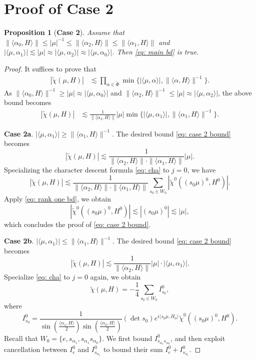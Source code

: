 \documentclass{amsart}
\numberwithin{equation}{section}
\newtheorem{prop}[thm]{Proposition}
\numberwithin{equation}{section}
\begin{document}
\section{Proof of \textbf{Case 2}}\label{sec: case 2}

\begin{prop}[\textbf{Case 2}]\label{prop: case 2}
    Assume that $\|\langle\alpha_0, H\rangle\|\leq|\mu|^{-1}\leq  \|\langle\alpha_2, H\rangle\|\leq \|\langle\alpha_1, H\rangle\|$ and $| \langle\mu,\alpha_1\rangle|\lesssim |\mu|\approx |\langle\mu,\alpha_2\rangle|\approx |\langle\mu,\alpha_0\rangle|$. Then \eqref{eq: main bd} is true. 
\end{prop}
\begin{proof}
It suffices to prove that 
\begin{align*}
|\widetilde{\chi}(\mu, H)|&\lesssim 
\prod_{\alpha\in\widetilde{\Phi}}\min\{|\langle\mu,\alpha\rangle|,\|\langle\alpha,H\rangle\|^{-1}\}.
\end{align*}
As $\|\langle\alpha_0, H\rangle\|^{-1}\geq|\mu|\approx|\langle\mu,\alpha_0\rangle|$ and $\|\langle\alpha_2, H\rangle\|^{-1}\leq|\mu|\approx|\langle\mu,\alpha_2\rangle|$, the above bound becomes 
\begin{align}\label{eq: case 2 bound}
|\widetilde{\chi}(\mu, H)|
&\lesssim \frac{1}{\|\langle\alpha_2, H\rangle\|}|\mu|\min\{|\langle\mu,\alpha_1\rangle|,\|\langle\alpha_1, H\rangle\|^{-1}\}.
\end{align}


\textbf{Case 2a}. $|\langle\mu,\alpha_1\rangle|\geq \|\langle\alpha_1, H\rangle\|^{-1}$. The desired bound \eqref{eq: case 2 bound} becomes 
$$|\widetilde{\chi}(\mu, H)|\lesssim \frac{1}{\|\langle\alpha_2, H\rangle\|\cdot \|\langle\alpha_1, H\rangle\|}|\mu|.$$
Specializing the character descent formula \eqref{eq: cha} to $j=0$, we have 
$$|\widetilde{\chi}(\mu, H)|\lesssim \frac{1}{\|\langle\alpha_2, H\rangle\|\cdot\|\langle\alpha_1, H\rangle\|}\sum_{s_0\in W_0}|\widetilde{\chi}^0({(s_0\mu)^0}, H^0)|.$$
Apply \eqref{eq: rank one bd}, we obtain 
$$|\widetilde{\chi}^0({(s_0\mu)^0}, H^0)|\lesssim |(s_0\mu)^0|\lesssim |\mu|,$$
which concludes the proof of \eqref{eq: case 2 bound}. 

\textbf{Case 2b}. $|\langle\mu,\alpha_1\rangle|\leq \|\langle\alpha_1, H\rangle\|^{-1}$. The desired bound \eqref{eq: case 2 bound} becomes 
$$|\widetilde{\chi}(\mu, H)|\lesssim \frac{1}{\|\langle\alpha_2, H\rangle\|}|\mu|\cdot  |\langle\mu,\alpha_1\rangle|.$$
Specialize \eqref{eq: cha} to $j=0$ again, we obtain 
$$
   \widetilde{\chi}(\mu, H)=-\frac{1}{4}\sum_{s_0\in W_0}I^0_{s_0},
   $$
   where 
   $$
   I^0_{s_0}=
   \frac{1}{\sin\left(\frac{\langle\alpha_1, H\rangle}{2}\right)\sin\left(\frac{\langle\alpha_2, H\rangle}{2}\right)}(\det s_0) 
e^{i\langle s_0\mu, H_{0}\rangle}\widetilde{\chi}^0({(s_0\mu)^0}, H^0).
$$
Recall that $W_0=\{e,s_{\alpha_1},s_{\alpha_1}s_{\alpha_0}\}$. 
We first bound $I^0_{s_{\alpha_1}s_{\alpha_0}}$, and then exploit cancellation between $I^0_{e}$ and $I^0_{s_{\alpha_1}}$ to bound their sum $I^0_e+I^0_{s_{\alpha_1}}$. 


\end{proof}
\end{document}

